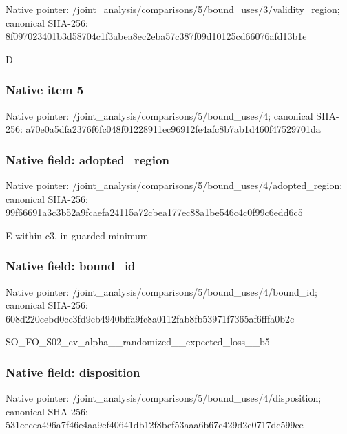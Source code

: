 \documentclass[10pt,a4paper]{article}
\begin{document}
Native pointer: /joint\_analysis/comparis\allowbreak{}ons/5/bound\_uses/3/valid\allowbreak{}ity\_region; canonical SHA-256: 8f097023401b3d58704c1f3a\allowbreak{}bea8ec2eba57c387f09d1012\allowbreak{}5cd66076afd13b1e


D


\subsubsection{Native item 5}


Native pointer: /joint\_analysis/comparis\allowbreak{}ons/5/bound\_uses/4; canonical SHA-256: a70e0a5dfa2376f6fc048f01\allowbreak{}228911ec96912fe4afc8b7ab\allowbreak{}1d460f47529701da



\subsubsection{Native field: adopted\_region}


Native pointer: /joint\_analysis/comparis\allowbreak{}ons/5/bound\_uses/4/adopt\allowbreak{}ed\_region; canonical SHA-256: 99f66691a3c3b52a9fcaefa2\allowbreak{}4115a72cbea177ec88a1be54\allowbreak{}6c4c0f99c6edd6c5


E within c3, in guarded minimum


\subsubsection{Native field: bound\_id}


Native pointer: /joint\_analysis/comparis\allowbreak{}ons/5/bound\_uses/4/bound\allowbreak{}\_id; canonical SHA-256: 608d220cebd0cc3fd9cb4940\allowbreak{}bffa9fc8a0112fab8fb53971\allowbreak{}f7365af6fffa0b2c


SO\_FO\_S02\_cv\_alpha\_\_rand\allowbreak{}omized\_\_expected\_loss\_\_b\allowbreak{}5


\subsubsection{Native field: disposition}


Native pointer: /joint\_analysis/comparis\allowbreak{}ons/5/bound\_uses/4/dispo\allowbreak{}sition; canonical SHA-256: 531cecca496a7f46e4aa9ef4\allowbreak{}0641db12f8bef53aaa6b67c4\allowbreak{}29d2c0717dc599ce
\end{document}
